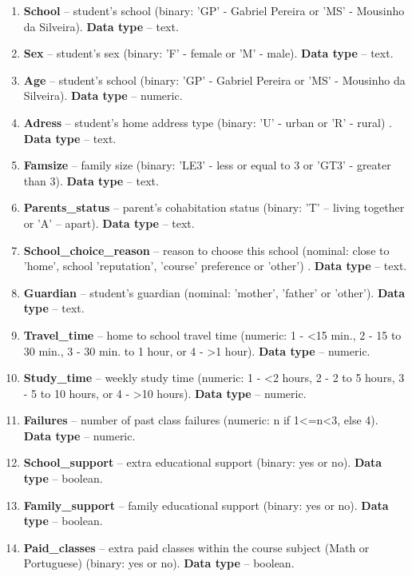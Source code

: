 \begin{enumerate}
\item \textbf{School} -- student's school (binary: 'GP' - Gabriel Pereira or 'MS' - Mousinho da Silveira). \textbf{Data type} -- text.
\item \textbf{Sex} -- student's sex (binary: 'F' - female or 'M' - male). \textbf{Data type} -- text.
\item \textbf{Age} -- student's school (binary: 'GP' - Gabriel Pereira or 'MS' - Mousinho da Silveira). \textbf{Data type} -- numeric.
\item \textbf{Adress} -- student's home address type (binary: 'U' - urban or 'R' - rural)  . \textbf{Data type} -- text.
\item \textbf{Famsize} -- family size (binary: 'LE3' - less or equal to 3 or 'GT3' - greater than 3). \textbf{Data type} -- text.
\item \textbf{Parents\_status} -- parent's cohabitation status (binary: 'T' -- living together or 'A' -- apart). \textbf{Data type} -- text.
\item \textbf{School\_choice\_reason} -- reason to choose this school (nominal: close to 'home', school 'reputation', 'course' preference or 'other') . \textbf{Data type} -- text.
\item \textbf{Guardian} -- student's guardian (nominal: 'mother', 'father' or 'other'). \textbf{Data type} -- text.
\item \textbf{Travel\_time} -- home to school travel time (numeric: 1 - <15 min., 2 - 15 to 30 min., 3 - 30 min. to 1 hour, or 4 - >1 hour). \textbf{Data type} -- numeric.
\item \textbf{Study\_time} -- weekly study time (numeric: 1 - <2 hours, 2 - 2 to 5 hours, 3 - 5 to 10 hours, or 4 - >10 hours). \textbf{Data type} -- numeric.
\item \textbf{Failures} -- number of past class failures (numeric: n if 1<=n<3, else 4). \textbf{Data type} -- numeric.
\item \textbf{School\_support} -- extra educational support (binary: yes or no). \textbf{Data type} -- boolean.
\item \textbf{Family\_support} -- family educational support (binary: yes or no). \textbf{Data type} -- boolean.
\item \textbf{Paid\_classes} -- extra paid classes within the course subject (Math or Portuguese) (binary: yes or no). \textbf{Data type} -- boolean.
\end{enumerate}


